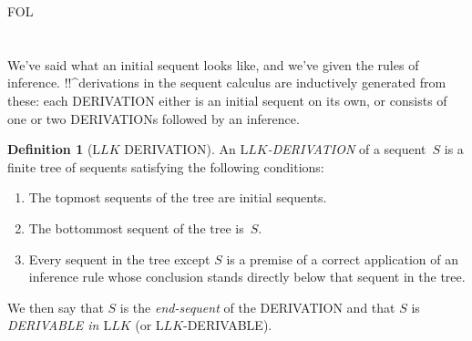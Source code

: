 \documentclass[10pt,a4paper]{article}
\newcommand*{\olup}[1]{\MakeUppercase{#1}}
\theoremstyle{plain}
\theoremstyle{definition}
\newtheorem{defn}[thm]{Definition}
\theoremstyle{remark}
\newenvironment{explain}{}{}
\newcommand*{\olfileid}[3]{}
\newcommand*{\olsection}[1]{\section*{#1}}
\providecommand{\Log}{\ensuremath{\mathrm{L}}}
\providecommand{\iftag}[1]{#1}
\providecommand{\iftag}{}
\begin{document}



\iftag{FOL}
      {\olfileid{fol}{seq}{der}}
      {\olfileid{pl}{seq}{der}}

\olsection{}

\begin{explain}
We've said what an initial sequent looks like, and we've given the
rules of inference.  !!^{derivation}s in the sequent calculus are
inductively generated from these: each \olup{derivation} either is an
initial sequent on its own, or consists of one or two \olup{derivation}s
followed by an inference.
\end{explain}

\begin{defn}[$\Log{LK}$ \olup{derivation}]
An \emph{$\Log{LK}$-\olup{derivation}} of a sequent~$S$ is a finite tree
of sequents satisfying the following conditions:
\begin{enumerate}
\item The topmost sequents of the tree are initial sequents.
\item The bottommost sequent of the tree is~$S$.
\item Every sequent in the tree except $S$ is a premise of a correct
  application of an inference rule whose conclusion stands directly
  below that sequent in the tree.
\end{enumerate}
We then say that $S$ is the \emph{end-sequent} of the \olup{derivation} and
that $S$ is \emph{\olup{derivable} in $\Log{LK}$} (or $\Log{LK}$-\olup{derivable}).
\end{defn}
\end{document}
